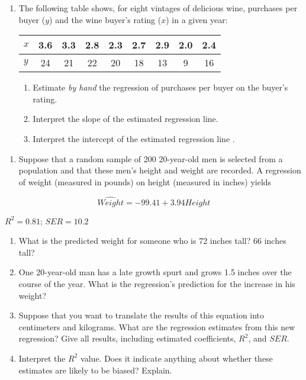 \documentclass[
]{article}
\providecommand{\tightlist}{%
  \setlength{\itemsep}{0pt}\setlength{\parskip}{0pt}}
\begin{document}
\begin{enumerate}
\def\labelenumi{\arabic{enumi}.}
\item
  The following table shows, for eight vintages of delicious wine,
  purchases per buyer (\(y\)) and the wine buyer's rating (\(x\)) in a
  given year:

  \begin{longtable}[]{@{}lcccccccc@{}}
  \toprule
  \(x\) & 3.6 & 3.3 & 2.8 & 2.3 & 2.7 & 2.9 & 2.0 & 2.4 \\
  \midrule
  \endhead
  \(y\) & 24 & 21 & 22 & 20 & 18 & 13 & 9 & 16 \\
  \bottomrule
  \end{longtable}

  \begin{enumerate}
  \def\labelenumii{\alph{enumii}.}
  \item
    Estimate \emph{by hand} the regression of purchases per buyer on the
    buyer's rating.\\
  \item
    Interpret the slope of the estimated regression line.\\
  \item
    Interpret the intercept of the estimated regression line .\\
  \end{enumerate}
\end{enumerate}

\begin{enumerate}
\def\labelenumi{\arabic{enumi}.}
\setcounter{enumi}{1}
\tightlist
\item
  Suppose that a random sample of 200 20-year-old men is selected from a
  population and that these men's height and weight are recorded. A
  regression of weight (measured in pounds) on height (measured in
  inches) yields
\end{enumerate}

\[\widehat{Weight}=-99.41 + 3.94 Height\]

\(R^2 = 0.81\); \(SER = 10.2\)

\begin{enumerate}
\def\labelenumi{\alph{enumi}.}
\item
  What is the predicted weight for someone who is 72 inches tall? 66
  inches tall?
\item
  One 20-year-old man has a late growth spurt and grows 1.5 inches over
  the course of the year. What is the regression's prediction for the
  increase in his weight?
\item
  Suppose that you want to translate the results of this equation into
  centimeters and kilograms. What are the regression estimates from this
  new regression? Give all results, including estimated coefficients,
  \(R^2\), and \(SER\).
\item
  Interpret the \(R^2\) value. Does it indicate anything about whether
  these estimates are likely to be biased? Explain.
\end{enumerate}
\end{document}
